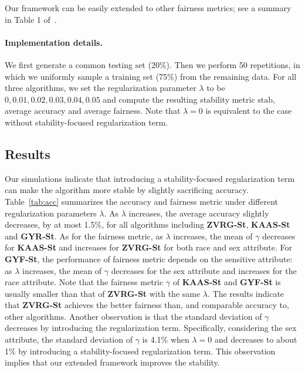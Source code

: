\documentclass[11pt]{article}
\begin{document}
\noindent
Our framework can be easily extended to other fairness metrics; see a summary in Table 1 of~\cite{celis2018classification}.

\paragraph{Implementation details.} We first generate a common testing set (20$\%$). 
%
Then we perform 50 repetitions, in which we uniformly sample a training set (75$\%$) from the remaining data.
%
For all three algorithms, we set the regularization parameter $\lambda$ to be $0, 0.01, 0.02, 0.03, 0.04, 0.05$ and compute the resulting stability metric $\mathrm{stab}$, average accuracy and average fairness.
%
Note that $\lambda = 0$ is equivalent to the case without stability-focused regularization term.
%



\subsection{Results}


Our simulations indicate that introducing a stability-focused regularization term can make the algorithm more stable by slightly sacrificing accuracy.
%
Table~\ref{tab:acc} summarizes the accuracy and fairness metric under different regularization parameters $\lambda$.
% 
As $\lambda$ increases, the average accuracy slightly decreases, by at most 1.5$\%$, for all algorithms including \textbf{ZVRG-St}, \textbf{KAAS-St} and \textbf{GYR-St}.
%
As for the fairness metric, as $\lambda$ increases, the mean of $\gamma$ decreases for \textbf{KAAS-St} and increases for \textbf{ZVRG-St} for both race and sex attribute.
%
For \textbf{GYF-St}, the performance of fairness metric depends on the sensitive attribute: as $\lambda$ increases, the mean of $\gamma$ decreases for the sex attribute and increases for the race attribute.
%
Note that the fairness metric $\gamma$ of \textbf{KAAS-St} and \textbf{GYF-St} is usually smaller than that of \textbf{ZVRG-St} with the same $\lambda$.
%
The results indicate that \textbf{ZVRG-St} achieves the better fairness than, and comparable accuracy to, other algorithms.
%
Another observation is that the standard deviation of $\gamma$ decreases by introducing the regularization term. 
%
Specifically, considering the sex attribute, the standard deviation of $\gamma$ is 4.1$\%$ when $\lambda=0$ and decreases to about 1$\%$ by introducing a stability-focused regularization term. 
%
This observation implies that our extended framework improves the stability.
%
\end{document}
